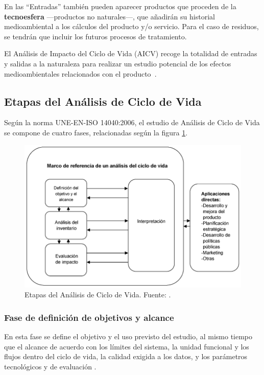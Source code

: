 En las ``Entradas'' también pueden aparecer productos que proceden de la \textbf{tecnoesfera} —productos no naturales—, que añadirán su historial medioambiental a los cálculos del producto y/o servicio. Para el caso de residuos, se tendrán que incluir los futuros procesos de tratamiento.

El Análisis de Impacto del Ciclo de Vida (AICV) recoge la totalidad de entradas y salidas a la naturaleza para realizar un estudio potencial de los efectos medioambientales relacionados con el producto \cite{iso14040}.

\subsection{Etapas del Análisis de Ciclo de Vida}\label{sec:etapaslca}

Según la norma UNE-EN-ISO 14040:2006, el estudio de Análisis de Ciclo de Vida se compone de cuatro fases, relacionadas según la figura \ref{fig:etapaslca}.

\begin{figure}[!htb]
\centering
\includegraphics[width=12cm]{img/etapas_lca.png}
\caption[Etapas del Análisis de Ciclo de Vida.]{Etapas del Análisis de Ciclo de Vida. Fuente: \protect\cite{iso14040}.}
\label{fig:etapaslca}
\end{figure}

\subsubsection{Fase de definición de objetivos y alcance}
En esta fase se define el objetivo y el uso previsto del estudio, al mismo tiempo que el alcance de acuerdo con los límites del sistema, la unidad funcional y los flujos dentro del ciclo de vida, la calidad exigida a los datos, y los parámetros tecnológicos y de evaluación \cite{iso14040,ihobeeco}.

